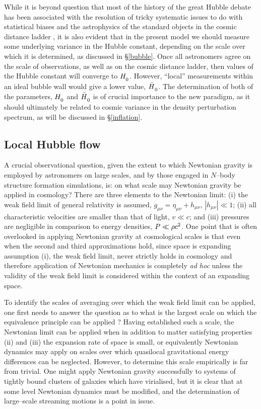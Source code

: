 \documentclass[12pt]{article}
\begin{document}
While it is beyond question that most of the history of the great Hubble
debate has been associated with the resolution of tricky systematic issues
to do with statistical biases and the astrophysics of the standard objects
in the cosmic distance ladder \cite{Tamm}, it is also evident that in the
present model we should measure some underlying variance in the Hubble
constant, depending on the scale over which it is determined, as
discussed in \S\ref{bubble}. Once all astronomers agree on the scale of
observations, as well as on the cosmic distance ladder, then values of
the Hubble constant will converge to $\Hm$. However, ``local'' measurements
within an ideal bubble wall would give a lower value, $\Hb$.
The determination of both of the parameters, $\Hm$ and $\Hb$
is of crucial importance to the new paradigm, as it should ultimately be
related to cosmic variance in the density perturbation spectrum, as will
be discussed in \S\ref{inflation}.

\subsection{Local Hubble flow\label{local}}

A crucial observational question, given the extent to which Newtonian gravity
is employed by astronomers on large scales, and by those engaged in $N$--body
structure formation simulations, is: on what scale may Newtonian gravity
be applied in cosmology? There are three elements to the Newtonian limit:
(i) the weak field limit of general relativity is assumed, $g_{\mu\nu}=
\eta_{\mu\nu}+h_{\mu\nu}$, $\left|h_{\mu\nu}\right|\ll1$; (ii) all
characteristic velocities are smaller than that of light, $v\ll c$; and
(iii) pressures are negligible in comparison to energy densities,
$P\ll\rho c^2$. One point that is often overlooked in applying Newtonian gravity
at cosmological scales is that even when the second and third approximations
hold, since space is expanding assumption (i), the weak field limit,
never strictly holds in cosmology and therefore application of Newtonian
mechanics is completely {\em ad hoc} unless the validity of the weak
field limit is considered within the context of an expanding space.

To identify the scales of averaging over which the weak field limit can be
applied, one first needs to answer the question as to what is the largest
scale on which the equivalence principle can be applied \cite{equiv}?
Having established such a scale, the
Newtonian limit can be applied when in addition to matter satisfying
properties (ii) and (iii) the expansion rate of space is small,
or equivalently Newtonian dynamics may apply on scales over which
quasilocal gravitational energy differences can be neglected.
However, to determine this scale empirically is far from trivial.
One might apply Newtonian gravity successfully to systems of tightly bound
clusters of galaxies which have virialised, but it is clear that at
some level Newtonian dynamics must be modified, and the determination
of large--scale streaming motions is a point in issue.
\end{document}
